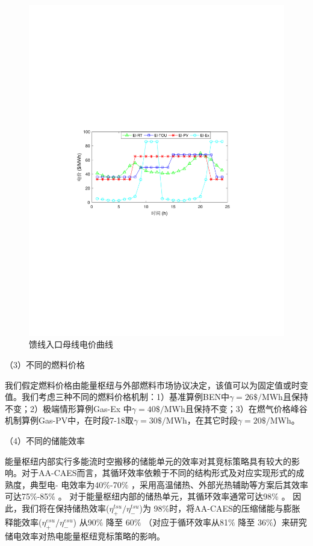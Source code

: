 \begin{figure}[!htp]
\centering
\includegraphics[scale=0.80]{figures/Chap4-7-ELPrice.pdf}
\caption{馈线入口母线电价曲线}
\label{Fig:GridPrice}
\end{figure}

（3）不同的燃料价格

我们假定燃料价格由能量枢纽与外部燃料市场协议决定，该值可以为固定值或时变值。我们考虑三种不同的燃料价格机制：1）基准算例BEN中$\gamma = 26 \$/$MWh且保持不变；2）极端情形算例Gas-Ex 中$\gamma = 40 \$/$MWh且保持不变；3）在燃气价格峰谷机制算例Gas-PV中，在时段7-18取$\gamma = 30 \$/$MWh，在其它时段$\gamma = 20 \$/$MWh。

（4）不同的储能效率

能量枢纽内部实行多能流时空搬移的储能单元的效率对其竞标策略具有较大的影响。对于AA-CAES而言，其循环效率依赖于不同的结构形式及对应实现形式的成熟度，典型电- 电效率为40$\%$-70$\%$ \cite{CAES-Reserve-11}，采用高温储热、外部光热辅助等方案后其效率可达75$\%$-85$\%$ \cite{A-CAES-Dynamic-17,AA-CAES-Demo-ALACAES-1,AA-CAES-Demo-ALACAES-2,ST-CAES-CXT-18}。 对于能量枢纽内部的储热单元，其循环效率通常可达98$\%$ \cite{TES-CSP-review-13}。 因此，我们将在保持储热效率($\eta_{+}^{tsu}/\eta_{-}^{tsu}$)为 98$\%$时，将AA-CAES的压缩储能与膨胀释能效率($\eta_{+}^{esu}/\eta_{-}^{esu}$) 从90$\%$ 降至 60$\%$ （对应于循环效率从81$\%$ 降至 36$\%$）来研究储电效率对热电能量枢纽竞标策略的影响。

